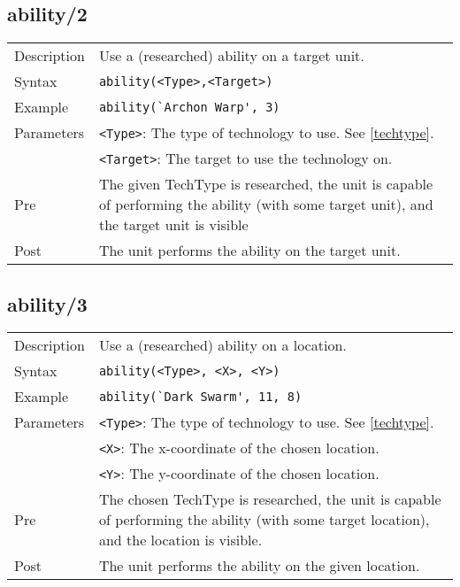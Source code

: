 \subsection{ability/2}
\begin{tabularx}{\textwidth}{lX}
 Description & Use a (researched) ability on a target unit. \\
 Syntax & \verb|ability(<Type>,<Target>)| \\
 Example & \verb|ability(`Archon Warp', 3)| \\
 Parameters & \verb|<Type>|: The type of technology to use. See \ref{techtype}. \\
            & \verb|<Target>|: The target to use the technology on.\\
 Pre & The given TechType is researched, the unit is capable of performing the ability (with some target unit), and the target unit is visible \\
 Post & The unit performs the ability on the target unit.
\end{tabularx}

\subsection{ability/3}
\begin{tabularx}{\textwidth}{lX}
 Description & Use a (researched) ability on a location. \\
 Syntax & \verb|ability(<Type>, <X>, <Y>)| \\
 Example & \verb|ability(`Dark Swarm', 11, 8)| \\
 Parameters & \verb|<Type>|: The type of technology to use. See \ref{techtype}. \\
            & \verb|<X>|: The x-coordinate of the chosen location. \\
            & \verb|<Y>|: The y-coordinate of the chosen location. \\
 Pre & The chosen TechType is researched, the unit is capable of performing the ability (with some target location), and the location is visible. \\
 Post & The unit performs the ability on the given location.
\end{tabularx}

